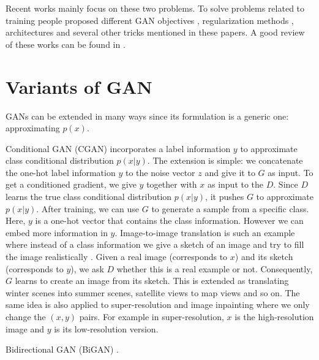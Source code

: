 \documentclass[a4paper,onesided,12pt]{report}
\begin{document}
Recent works mainly focus on these two problems. To solve problems related to training people proposed different GAN objectives \cite{arjovsky2017wasserstein,chen2016infogan,mao2017least,qi2017loss}, regularization methods \cite{gulrajani2017improved,miyato2018spectral,radford2015unsupervised}, architectures \cite{brock2018large,donahue2016adversarial,dumoulin2016adversarially,karras2017progressive,karras2019style,radford2015unsupervised,zhang2018self} and several other tricks mentioned in these papers. A good review of these works can be found in \cite{creswell2018generative,hong2019generative,kurach2018gan}.

\section{Variants of GAN}
\label{sec:variants}

GANs can be extended in many ways since its formulation is a generic one: approximating $p(x)$.

Conditional GAN (CGAN) \cite{mirza2014conditional} incorporates a label information $y$ to approximate class conditional distribution $p(x|y)$. The extension is simple: we concatenate the one-hot label information $y$ to the noise vector $z$ and give it to $G$ as input. To get a conditioned gradient, we give $y$ together with $x$ as input to the $D$. Since $D$ learns the true class conditional distribution $p(x|y)$, it pushes $G$ to approximate $p(x|y)$. After training, we can use $G$ to generate a sample from a specific class. Here, $y$ is a one-hot vector that contains the class information. However we can embed more information in $y$. Image-to-image translation is such an example where instead of a class information we give a sketch of an image and try to fill the image realistically \cite{isola2017image}. Given a real image (corresponds to $x$) and its sketch (corresponds to $y$), we ask $D$ whether this is a real example or not. Consequently, $G$ learns to create an image from its sketch. This is extended as translating winter scenes into summer scenes, satellite views to map views and so on. The same idea is also applied to super-resolution \cite{ledig2017photo} and image inpainting \cite{yeh2017semantic} where we only change the $(x, y)$ pairs. For example in super-resolution, $x$ is the high-resolution image and $y$ is its low-resolution version.

Bidirectional GAN (BiGAN) \cite{donahue2016adversarial,dumoulin2016adversarially}.
\end{document}
